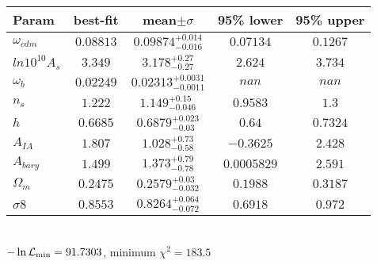 \begin{tabular}{|l|c|c|c|c|} 
 \hline 
Param & best-fit & mean$\pm\sigma$ & 95\% lower & 95\% upper \\ \hline 
$\omega_{cdm }$ &$0.08813$ & $0.09874_{-0.016}^{+0.014}$ & $0.07134$ & $0.1267$ \\ 
$ln10^{10}A_{s }$ &$3.349$ & $3.178_{-0.27}^{+0.27}$ & $2.624$ & $3.734$ \\ 
$\omega_{b }$ &$0.02249$ & $0.02313_{-0.0011}^{+0.0031}$ & $nan$ & $nan$ \\ 
$n_{s }$ &$1.222$ & $1.149_{-0.046}^{+0.15}$ & $0.9583$ & $1.3$ \\ 
$h$ &$0.6685$ & $0.6879_{-0.03}^{+0.023}$ & $0.64$ & $0.7324$ \\ 
$A_{IA }$ &$1.807$ & $1.028_{-0.58}^{+0.73}$ & $-0.3625$ & $2.428$ \\ 
$A_{bary }$ &$1.499$ & $1.373_{-0.78}^{+0.79}$ & $0.0005829$ & $2.591$ \\ 
$\Omega_{m }$ &$0.2475$ & $0.2579_{-0.032}^{+0.03}$ & $0.1988$ & $0.3187$ \\ 
$\sigma8$ &$0.8553$ & $0.8264_{-0.072}^{+0.064}$ & $0.6918$ & $0.972$ \\ 
\hline 
 \end{tabular} \\ 
$-\ln{\cal L}_\mathrm{min} =91.7303$, minimum $\chi^2=183.5$ \\ 
